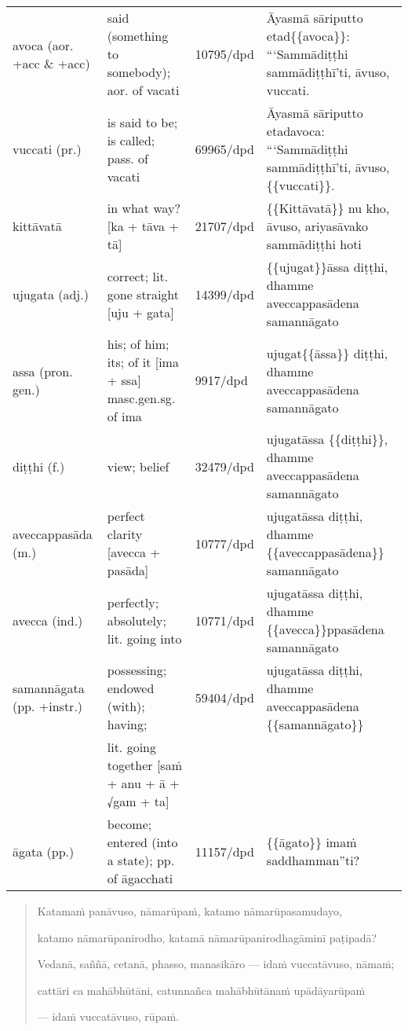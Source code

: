 \documentclass[11pt,oneside]{memoir}
\begin{document}
\begin{longtable}{L{\colOne} L{\colTwo} H H}
avoca (aor. +acc \& +acc) & said (something to somebody); aor. of vacati & 10795/dpd & Āyasmā sāriputto etad\{\{avoca\}\}: “‘Sammādiṭṭhi sammādiṭṭhī’ti, āvuso, vuccati.\\[0pt]
vuccati (pr.) & is said to be; is called; pass. of vacati & 69965/dpd & Āyasmā sāriputto etadavoca: “‘Sammādiṭṭhi sammādiṭṭhī’ti, āvuso, \{\{vuccati\}\}.\\[0pt]
kittāvatā & in what way? [ka + tāva + tā] & 21707/dpd & \{\{Kittāvatā\}\} nu kho, āvuso, ariyasāvako sammādiṭṭhi hoti\\[0pt]
ujugata (adj.) & correct; lit. gone straight [uju + gata] & 14399/dpd & \{\{ujugat\}\}āssa diṭṭhi, dhamme aveccappasādena samannāgato\\[0pt]
assa (pron. gen.) & his; of him; its; of it [ima + ssa] masc.gen.sg. of ima & 9917/dpd & ujugat\{\{āssa\}\} diṭṭhi, dhamme aveccappasādena samannāgato\\[0pt]
diṭṭhi (f.) & view; belief & 32479/dpd & ujugatāssa \{\{diṭṭhi\}\}, dhamme aveccappasādena samannāgato\\[0pt]
aveccappasāda (m.) & perfect clarity [avecca + pasāda] & 10777/dpd & ujugatāssa diṭṭhi, dhamme \{\{aveccappasādena\}\} samannāgato\\[0pt]
avecca (ind.) & perfectly; absolutely; lit. going into & 10771/dpd & ujugatāssa diṭṭhi, dhamme \{\{avecca\}\}ppasādena samannāgato\\[0pt]
samannāgata (pp. +instr.) & possessing; endowed (with); having; & 59404/dpd & ujugatāssa diṭṭhi, dhamme aveccappasādena \{\{samannāgato\}\}\\[0pt]
 & lit. going together [saṁ + anu + ā + √gam + ta] &  & \\[0pt]
āgata (pp.) & become; entered (into a state); pp. of āgacchati & 11157/dpd & \{\{āgato\}\} imaṁ saddhamman”ti?\\[0pt]
\end{longtable}


\clearpage
\casesLegendHeaderBGHere

\begin{quote}
Katamaṁ panāvuso, nāmarūpaṁ, katamo nāmarūpasamudayo,

katamo nāmarūpanirodho, katamā nāmarūpanirodhagāminī paṭipadā?

Vedanā, saññā, cetanā, phasso, manasikāro — idaṁ vuccatāvuso, nāmaṁ;

cattāri ca mahābhūtāni, catunnañca mahābhūtānaṁ upādāyarūpaṁ

— idaṁ vuccatāvuso, rūpaṁ.
\end{quote}
\end{document}
